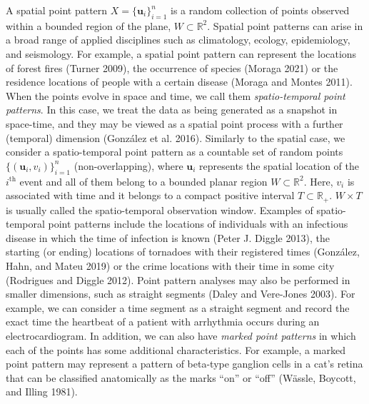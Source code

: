 A spatial point pattern \(X=\{\mathbf{u}_i\}_{i=1}^n\) is a random collection of points observed within a bounded region of the plane, \(W \subset\mathbb{R}^2\). Spatial point patterns can arise in a broad range of applied disciplines such as climatology, ecology, epidemiology, and seismology. For example, a spatial point pattern can represent the locations of forest fires (Turner 2009), the occurrence of species (Moraga 2021) or the residence locations of people with a certain disease (Moraga and Montes 2011). When the points evolve in space and time, we call them \emph{spatio-temporal point patterns}.
In this case, we treat the data as being generated as a snapshot in space-time, and they may be viewed as a spatial point process with a further (temporal) dimension (González et al. 2016). Similarly to the spatial case, we consider a spatio-temporal point pattern as a countable set of random points \(\{(\mathbf{u}_i,v_i)\}_{i=1}^n\) (non-overlapping), where \(\mathbf{u}_i\) represents the spatial location of the \(i^{\text{th}}\) event and all of them belong to a bounded planar region \(W \subset\mathbb{R}^2\). Here, \(v_i\) is associated with time and it belongs to a compact positive interval \(T\subset \mathbb{R}_+\). \(W \times T\) is usually called the spatio-temporal observation window. Examples of spatio-temporal point patterns include the locations of individuals with an infectious disease in which the time of infection is known (Peter J. Diggle 2013), the starting (or ending) locations of tornadoes with their registered times (González, Hahn, and Mateu 2019) or the crime locations with their time in some city (Rodrigues and Diggle 2012). Point pattern analyses may also be performed in smaller dimensions, such as straight segments (Daley and Vere-Jones 2003). For example, we can consider a time segment as a straight segment and record the exact time the heartbeat of a patient with arrhythmia occurs during an electrocardiogram. In addition, we can also have \emph{marked point patterns} in which each of the points has some additional characteristics. For example, a marked point pattern may represent a pattern of beta-type ganglion cells in a cat's retina that can be classified anatomically as the marks ``on'' or ``off'' (Wässle, Boycott, and Illing 1981).

